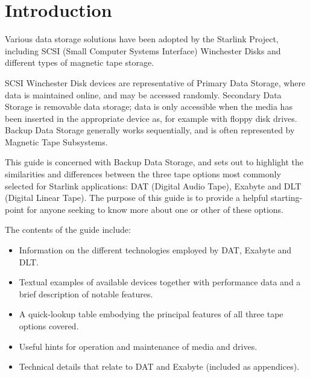 \documentclass[11pt]{article}
\newcommand{\stardocinitials}  {SSN}
\newcommand{\stardocnumber}    {31.1}
\newcommand{\stardocname}{\stardocinitials /\stardocnumber}
\newenvironment{latexonly}{}{}
\renewcommand{\thepage}{\roman{page}}
\begin{document}
\begin{latexonly}
   \setlength{\parskip}{0mm}
   \tableofcontents
   \setlength{\parskip}{\medskipamount}
   \markright{\stardocname}
\end{latexonly}
\newpage
\renewcommand{\thepage}{\arabic{page}}
\setcounter{page}{1}

\section {Introduction}

Various data storage solutions have been adopted by the Starlink Project,
including SCSI (Small Computer Systems Interface) Winchester Disks and
different types of magnetic tape storage.

SCSI Winchester Disk devices are representative of Primary Data Storage,
where data is maintained online, and may be accessed randomly. Secondary
Data Storage is removable data storage; data is only accessible when the
media has been inserted in the appropriate device as, for example with
floppy disk drives. Backup Data Storage generally works sequentially, and is
often represented by Magnetic Tape Subsystems.

This guide is concerned with Backup Data Storage, and sets out to highlight
the similarities and differences between the three tape options most
commonly selected for Starlink applications: DAT (Digital Audio Tape),
Exabyte and DLT (Digital Linear Tape). The purpose of this guide is to
provide a helpful starting-point for anyone seeking to know more about one
or other of these options.

The contents of the guide include:

\begin {itemize}

\item Information on the different technologies employed by DAT, Exabyte and
DLT.

\item Textual examples of available devices together with performance data and
a brief description of notable features.

\item A quick-lookup table embodying the principal features of all three tape
options covered.

\item Useful hints for operation and maintenance of media and drives.

\item Technical details that relate to DAT and Exabyte (included as
appendices).

\end {itemize}
\end{document}
